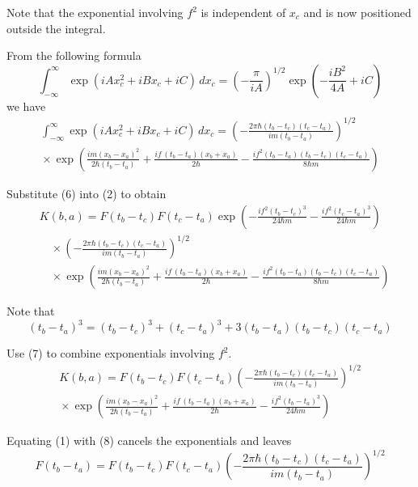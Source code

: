 \documentclass[12pt]{article}
\begin{document}
\bigskip
Note that the exponential involving $f^2$ is independent of $x_c$
and is now positioned outside the integral.

\bigskip
From the following formula
\begin{equation*}
\int_{-\infty}^{\infty}\exp(iAx_c^2+iBx_c+iC)\,dx_c
=\left(-\frac{\pi}{iA}\right)^{1/2}
\exp\left(-\frac{iB^2}{4A}+iC\right)
\end{equation*}
we have
{\footnotesize
\begin{multline*}
\int_{-\infty}^{\infty}\exp(iAx_c^2+iBx_c+iC)\,dx_c
=\left(-\frac{2\pi\hbar(t_b-t_c)(t_c-t_a)}{im(t_b-t_a)}\right)^{1/2}
\\
{}\times\exp\left(
\frac{im(x_b-x_a)^2}{2\hbar(t_b-t_a)}
+\frac{if\,(t_b-t_a)(x_b+x_a)}{2\hbar}
-\frac{if^2(t_b-t_a)(t_b-t_c)(t_c-t_a)}{8\hbar m}
\right)
\tag{6}
\end{multline*}
}

\bigskip
Substitute (6) into (2) to obtain
{\footnotesize
\begin{align*}
&K(b,a)=F(t_b-t_c)F(t_c-t_a)
\exp\left(-\frac{if^2(t_b-t_c)^3}{24\hbar m}-\frac{if^2(t_c-t_a)^3}{24\hbar m}\right)
\\
&\quad{}\times
\left(-\frac{2\pi\hbar(t_b-t_c)(t_c-t_a)}{im(t_b-t_a)}\right)^{1/2}
\\
&\quad{}\times
\exp\left(
\frac{im(x_b-x_a)^2}{2\hbar(t_b-t_a)}
+\frac{if\,(t_b-t_a)(x_b+x_a)}{2\hbar}
-\frac{if^2(t_b-t_a)(t_b-t_c)(t_c-t_a)}{8\hbar m}
\right)
\end{align*}
}

Note that
\begin{equation*}
(t_b-t_a)^3=(t_b-t_c)^3+(t_c-t_a)^3+3(t_b-t_a)(t_b-t_c)(t_c-t_a)
\tag{7}
\end{equation*}

Use (7) to combine exponentials involving $f^2$.
\begin{multline*}
K(b,a)=F(t_b-t_c)F(t_c-t_a)
\left(-\frac{2\pi\hbar(t_b-t_c)(t_c-t_a)}{im(t_b-t_a)}\right)^{1/2}
\\
{}\times
\exp\left(
\frac{im(x_b-x_a)^2}{2\hbar(t_b-t_a)}
+\frac{if\,(t_b-t_a)(x_b+x_a)}{2\hbar}
-\frac{if^2(t_b-t_a)^3}{24\hbar m}
\right)
\tag{8}
\end{multline*}

Equating (1) with (8) cancels the exponentials and leaves
\begin{equation*}
F(t_b-t_a)=F(t_b-t_c)F(t_c-t_a)
\left(-\frac{2\pi\hbar(t_b-t_c)(t_c-t_a)}{im(t_b-t_a)}\right)^{1/2}
\tag{9}
\end{equation*}
\end{document}

